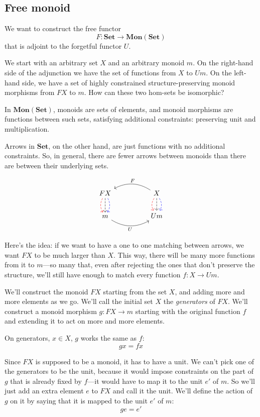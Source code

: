 \documentclass[DaoFP]{subfiles}
\begin{document}
\subsection{Free monoid}

We want to construct the free functor 
\[ F \colon \mathbf{Set} \to \mathbf{Mon}(\mathbf{Set})\]
that is adjoint to the forgetful functor $U$. 

We start with an arbitrary set $X$ and an arbitrary monoid $m$. On the right-hand side of the adjunction we have the set of functions from $X$ to $U m$. On the left-hand side, we have a set of highly constrained structure-preserving monoid morphisms from $F X$ to $m$. How can these two hom-sets be isomorphic?

In  $\mathbf{Mon}(\mathbf{Set})$, monoids are sets of elements, and monoid morphisms are functions between such sets, satisfying additional constraints: preserving unit and multiplication. 

Arrows in $\mathbf{Set}$, on the other hand, are just functions with no additional constraints. So, in general, there are fewer arrows between monoids than there are between their underlying sets. 

\[
 \begin{tikzcd}
F X
\arrow[d, bend right, red, dashed]
\arrow[d, dashed]
\arrow[d, bend left, blue, dashed]
  &&
X
\arrow[d, bend right, red, dashed]
\arrow[d, dashed]
\arrow[d, bend left, blue, dashed]
 \arrow[ll, bend right, "F"']
 \\
m
   \arrow[rr, bend right, "U"']
 &&
 U m
  \end{tikzcd}
\]

Here's the idea: if we want to have a one to one matching between arrows, we want $F X$ to be much larger than $X$. This way, there will be many more functions from it to $m$---so many that, even after rejecting the ones that don't preserve the structure, we'll still have enough to match every function $f \colon X \to U m$.

We'll construct the monoid $F X$ starting from the set $X$, and adding more and more elements as we go. We'll call the initial set $X$ the \emph{generators} of $F X$. We'll construct a monoid morphism $g \colon F X \to m$ starting with the original function $f$ and extending it to act on more and more elements.

On generators, $x \in X$, $g$ works the same as $f$:
\[ g x = f x \]

Since $F X$ is supposed to be a monoid, it has to have a unit. We can't pick one of the generators to be the unit, because it would impose constraints on the part of $g$ that is already fixed by $f$---it would have to map it to the unit $e'$ of $m$. So we'll just add an extra element $e$ to $F X$ and call it the unit. We'll define the action of $g$ on it by saying that it is mapped to the unit $e'$ of $m$:
\[ g e = e' \]
\end{document}
